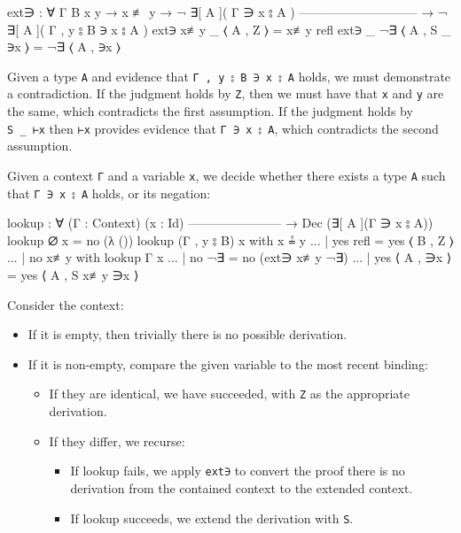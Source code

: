 \begin{fence}
\begin{code}
ext∋ : ∀ {Γ B x y}
  → x ≢ y
  → ¬ ∃[ A ]( Γ ∋ x ⦂ A )
    -----------------------------
  → ¬ ∃[ A ]( Γ , y ⦂ B ∋ x ⦂ A )
ext∋ x≢y _  ⟨ A , Z ⟩       =  x≢y refl
ext∋ _   ¬∃ ⟨ A , S _ ∋x ⟩  =  ¬∃ ⟨ A , ∋x ⟩
\end{code}
\end{fence}

Given a type \texttt{A} and evidence that
\texttt{Γ\ ,\ y\ ⦂\ B\ ∋\ x\ ⦂\ A} holds, we must demonstrate a
contradiction. If the judgment holds by \texttt{Z}, then we must have
that \texttt{x} and \texttt{y} are the same, which contradicts the first
assumption. If the judgment holds by \texttt{S\ \_\ ⊢x} then \texttt{⊢x}
provides evidence that \texttt{Γ\ ∋\ x\ ⦂\ A}, which contradicts the
second assumption.

Given a context \texttt{Γ} and a variable \texttt{x}, we decide whether
there exists a type \texttt{A} such that \texttt{Γ\ ∋\ x\ ⦂\ A} holds,
or its negation:

\begin{fence}
\begin{code}
lookup : ∀ (Γ : Context) (x : Id)
    -----------------------
  → Dec (∃[ A ](Γ ∋ x ⦂ A))
lookup ∅ x                        =  no  (λ ())
lookup (Γ , y ⦂ B) x with x ≟ y
... | yes refl                    =  yes ⟨ B , Z ⟩
... | no x≢y with lookup Γ x
...             | no  ¬∃          =  no  (ext∋ x≢y ¬∃)
...             | yes ⟨ A , ∋x ⟩  =  yes ⟨ A , S x≢y ∋x ⟩
\end{code}
\end{fence}

Consider the context:

\begin{itemize}
\item
  If it is empty, then trivially there is no possible derivation.
\item
  If it is non-empty, compare the given variable to the most recent
  binding:

  \begin{itemize}
  \item
    If they are identical, we have succeeded, with \texttt{Z} as the
    appropriate derivation.
  \item
    If they differ, we recurse:

    \begin{itemize}
    \item
      If lookup fails, we apply \texttt{ext∋} to convert the proof there
      is no derivation from the contained context to the extended
      context.
    \item
      If lookup succeeds, we extend the derivation with \texttt{S}.
    \end{itemize}
  \end{itemize}
\end{itemize}

